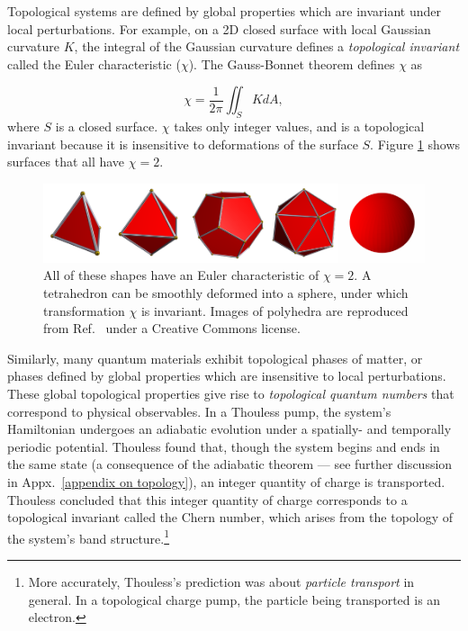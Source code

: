 \documentclass[double,12pt,1in,seploa]{beavtex}
\begin{document}
Topological systems are defined by global properties which are invariant under local perturbations. For example, on a 2D closed surface with local Gaussian curvature $K$, the integral of the Gaussian curvature defines a \textit{topological invariant} called the Euler characteristic ($\chi$). The Gauss-Bonnet theorem defines $\chi$ as

\begin{equation}
    \chi = \frac{1}{2\pi}\iint_S K dA,
\end{equation}
where $S$ is a closed surface. $\chi$ takes only integer values, and is a topological invariant because it is insensitive to deformations of the surface $S$. Figure \ref{surfaces} shows surfaces that all have $\chi = 2$.

\begin{figure}
    \includegraphics{shapes intro fig.pdf}
    \caption{All of these shapes have an Euler characteristic of $\chi = 2$. A tetrahedron can be smoothly deformed into a sphere, under which transformation $\chi$ is invariant. Images of polyhedra are reproduced from Ref.\ \cite{webb_stella_nodate} under a Creative Commons license.}
    \label{surfaces}
\end{figure}

Similarly, many quantum materials exhibit topological phases of matter, or phases defined by global properties which are insensitive to local perturbations. These global topological properties give rise to \textit{topological quantum numbers} that correspond to physical observables. In a Thouless pump, the system's Hamiltonian undergoes an adiabatic evolution under a spatially- and temporally periodic potential. Thouless found that, though the system begins and ends in the same state (a consequence of the adiabatic theorem — see further discussion in Appx.\ \ref{appendix on topology}), an integer quantity of charge is transported. Thouless concluded that this integer quantity of charge corresponds to a topological invariant called the Chern number, which arises from the topology of the system's band structure.\footnote{More accurately, Thouless's prediction was about \textit{particle transport} in general. In a topological charge pump, the particle being transported is an electron.}
\end{document}
